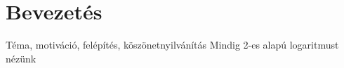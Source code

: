 \section*{Bevezetés}
\label{sec:bevezetes}
Téma, motiváció, felépítés, köszönetnyilvánítás
Mindig 2-es alapú logaritmust nézünk
